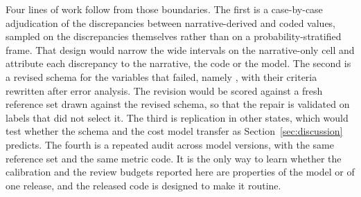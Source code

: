 Four lines of work follow from those boundaries. The first is a case-by-case adjudication of
the discrepancies between narrative-derived and coded values, sampled on the discrepancies
themselves rather than on a probability-stratified frame. That design would narrow the wide
intervals on the narrative-only cell and attribute each discrepancy to the narrative, the
code or the model. The second is a revised schema for the
\GoldNWeak{} variables that failed, namely \GoldWeakVars{}, with their criteria rewritten after
error analysis. The revision would be scored against a fresh reference
set drawn against the revised schema, so that the repair is validated on labels that did not
select it. The third is replication in other states, which would test whether the schema and the cost
model transfer as Section~\ref{sec:discussion} predicts. The fourth is a repeated audit across model versions, with the same reference set
and the same metric code. It is the only way to learn whether the calibration and the review
budgets reported here are properties of the model or of one release, and the released code is
designed to make it routine.
